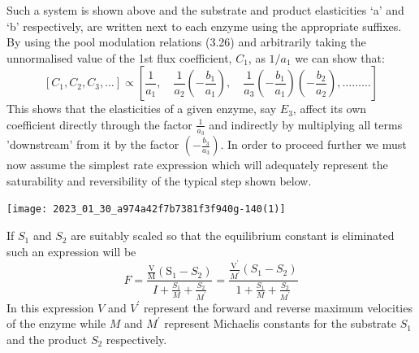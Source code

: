 Such a system is shown above and the substrate and product elasticities `a' and `b' respectively, are written next to each enzyme using the appropriate suffixes. By using the pool modulation relations (3.26) and arbitrarily taking the unnormalised value of the 1st flux coefficient, $C_{1}$, as $1/a_{1}$ we can show that:
%
\begin{equation}
\left[C_{1}, C_{2}, C_{3}, \ldots\right] \propto\left[\frac{1}{a_{1}}, \quad \frac{1}{a_{2}}\left(-\frac{b_{1}}{a_{1}}\right), \quad \frac{1}{a_{3}}\left(-\frac{b_{1}}{a_{1}}\right)\left(-\frac{b_{2}}{a_{2}}\right), \ldots \ldots \ldots\right]
\label{eqn:339}
\end{equation}
%
This shows that the elasticities of a given enzyme, say $E_{3}$, affect its own coefficient directly through the factor $\frac{1}{a_{3}}$ and indirectly by multiplying all terms 'downstream' from it by the factor $\left(-\frac{b_{3}}{a_{3}}\right)$. In order to proceed further we must now assume the simplest rate expression which will adequately represent the saturability and reversibility of the typical step shown below.

\begin{center}
\texttt{[image: 2023\_01\_30\_a974a42f7b7381f3f940g-140(1)]}
\end{center}

If $S_{1}$ and $S_{2}$ are suitably scaled so that the equilibrium constant is eliminated such an expression will be
%
\begin{equation}
F=\frac{\frac{\mathrm{V}}{\mathrm{M}}\left(\mathrm{S}_{1}-S_{2}\right)}{I+\frac{S_{1}}{M}+\frac{S_{2}}{M^{\prime}}}=\frac{\frac{\mathrm{V}^{\prime}}{M^{\prime}}\left(S_{1}-
S_{2}\right)}{1+\frac{S_{1}}{M}+\frac{S_2}{M^{\prime}}}
\label{eqn:339}
\end{equation}
%
In this expression $V$ and $V^{\prime}$ represent the forward and reverse maximum velocities of the enzyme while $M$ and $M^{\prime}$ represent Michaelis constants for the substrate $S_{1}$ and the product $S_{2}$ respectively.

